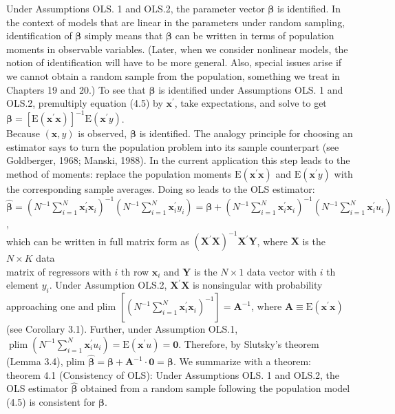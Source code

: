 \documentclass[10pt]{article}
\begin{document}
Under Assumptions OLS. 1 and OLS.2, the parameter vector $\boldsymbol{\beta}$ is identified. In the context of models that are linear in the parameters under random sampling, identification of $\boldsymbol{\beta}$ simply means that $\boldsymbol{\beta}$ can be written in terms of population moments in observable variables. (Later, when we consider nonlinear models, the notion of identification will have to be more general. Also, special issues arise if we cannot obtain a random sample from the population, something we treat in Chapters 19 and 20.) To see that $\boldsymbol{\beta}$ is identified under Assumptions OLS. 1 and OLS.2, premultiply equation (4.5) by $\mathbf{x}^{\prime}$, take expectations, and solve to get\\
$\boldsymbol{\beta}=\left[\mathrm{E}\left(\mathbf{x}^{\prime} \mathbf{x}\right)\right]^{-1} \mathrm{E}\left(\mathbf{x}^{\prime} y\right)$.\\
Because $(\mathbf{x}, y)$ is observed, $\boldsymbol{\beta}$ is identified. The analogy principle for choosing an estimator says to turn the population problem into its sample counterpart (see Goldberger, 1968; Manski, 1988). In the current application this step leads to the method of moments: replace the population moments $\mathrm{E}\left(\mathbf{x}^{\prime} \mathbf{x}\right)$ and $\mathrm{E}\left(\mathbf{x}^{\prime} y\right)$ with the corresponding sample averages. Doing so leads to the OLS estimator:\\
$\hat{\boldsymbol{\beta}}=\left(N^{-1} \sum_{i=1}^{N} \mathbf{x}_{i}^{\prime} \mathbf{x}_{i}\right)^{-1}\left(N^{-1} \sum_{i=1}^{N} \mathbf{x}_{i}^{\prime} y_{i}\right)=\boldsymbol{\beta}+\left(N^{-1} \sum_{i=1}^{N} \mathbf{x}_{i}^{\prime} \mathbf{x}_{i}\right)^{-1}\left(N^{-1} \sum_{i=1}^{N} \mathbf{x}_{i}^{\prime} u_{i}\right)$,\\
which can be written in full matrix form as $\left(\mathbf{X}^{\prime} \mathbf{X}\right)^{-1} \mathbf{X}^{\prime} \mathbf{Y}$, where $\mathbf{X}$ is the $N \times K$ data\\
matrix of regressors with $i$ th row $\mathbf{x}_{i}$ and $\mathbf{Y}$ is the $N \times 1$ data vector with $i$ th element $y_{i}$. Under Assumption OLS.2, $\mathbf{X}^{\prime} \mathbf{X}$ is nonsingular with probability approaching one and plim $\left[\left(N^{-1} \sum_{i=1}^{N} \mathbf{x}_{i}^{\prime} \mathbf{x}_{i}\right)^{-1}\right]=\mathbf{A}^{-1}$, where $\mathbf{A} \equiv \mathrm{E}\left(\mathbf{x}^{\prime} \mathbf{x}\right)$ (see Corollary 3.1). Further, under Assumption OLS.1, $\operatorname{plim}\left(N^{-1} \sum_{i=1}^{N} \mathbf{x}_{i}^{\prime} u_{i}\right)=\mathrm{E}\left(\mathbf{x}^{\prime} u\right)=\mathbf{0}$. Therefore, by Slutsky's theorem (Lemma 3.4), plim $\hat{\boldsymbol{\beta}}=\boldsymbol{\beta}+\mathbf{A}^{-1} \cdot \mathbf{0}=\boldsymbol{\beta}$. We summarize with a theorem:\\
theorem 4.1 (Consistency of OLS): Under Assumptions OLS. 1 and OLS.2, the OLS estimator $\hat{\boldsymbol{\beta}}$ obtained from a random sample following the population model (4.5) is consistent for $\boldsymbol{\beta}$.
\end{document}
